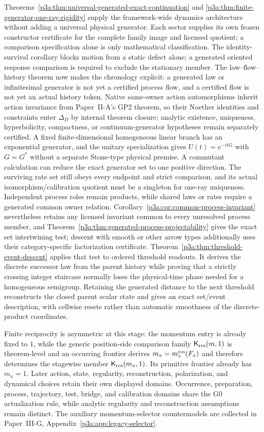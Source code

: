 \documentclass[12pt,a4paper]{article}
\begin{document}
Theorems~\ref{p3a:thm:universal-generated-exact-continuation} and
\ref{p3a:thm:finite-generator-one-ray-rigidity} supply the framework-wide
dynamics architecture without adding a universal physical generator.
Each sector supplies its own frozen constructor certificate for the complete
family image and licensed quotient; a comparison specification alone is only
mathematical classification.  The
identity-survival corollary blocks motion from a static defect alone; a
generated oriented response comparison is required to exclude the stationary
member.  The law--flow--history theorem now makes the chronology explicit: a
generated law or infinitesimal generator is not yet a certified process flow,
and a certified flow is not yet an actual history token.  Native same-owner
action automorphisms inherit action invariance from Paper~II-A's GP2 theorem,
so their Noether identities and constraints enter \(\Delta_D\) by internal
theorem closure; analytic existence, uniqueness, hyperbolicity, compactness,
or continuum-generator hypotheses remain separately certified.  A fixed
finite-dimensional homogeneous linear branch has an exponential generator,
and the unitary specialization gives \(U(t)=e^{-itG}\) with \(G=G^*\)
without a separate Stone-type physical premise.  A commutant calculation can reduce the exact generator set to one positive
direction. The surviving rate set still obeys every endpoint and strict
comparison, and its actual isomorphism/calibration quotient must be a
singleton for one-ray uniqueness.
Independent process roles remain products, while shared laws or rates require
a generated common owner relation.  Corollary~\ref{p3a:cor:common-process-invariant}
nevertheless retains any licensed invariant common to every unresolved
process member, and Theorem~\ref{p3a:thm:generated-process-projectability}
gives the exact set intertwining test; descent with smooth or other arrow
types additionally uses their category-specific factorization certificate.
Theorem~\ref{p3a:thm:threshold-event-descent} applies that test to ordered
threshold readouts.  It derives the discrete successor law from the parent
history while proving that a strictly crossing integer staircase normally
loses the physical-time phase needed for a homogeneous semigroup.  Retaining
the generated distance to the next threshold reconstructs the closed parent
scalar state and gives an exact set/event description, with cellwise resets
rather than automatic smoothness of the discrete-product coordinates.

Finite reciprocity is asymmetric at this stage: the momentum entry is already
fixed to $1$, while the generic position-side comparison family
$\mathsf K_{\rm res}(m,1)$ is theorem-level and an occurring frontier derives $m_x=m_x^{\rm res}(F_x)$ and therefore
determines the stagewise member $\mathsf K_{\rm res}(m_x,1)$.  Its primitive frontier
already has $m_x=1$.  Later action, state, regularity,
reconstruction, polarization, and dynamical choices retain their own displayed
domains.  Occurrence, preparation, process, trajectory, test, bridge, and
calibration domains share the G0 actualization rule, while analytic regularity
and reconstruction assumptions remain distinct.  The auxiliary momentum-selector countermodels are collected in
Paper~III-G, Appendix~\ref{p3a:app:legacy-selector}.

\printbibliography
\end{document}
